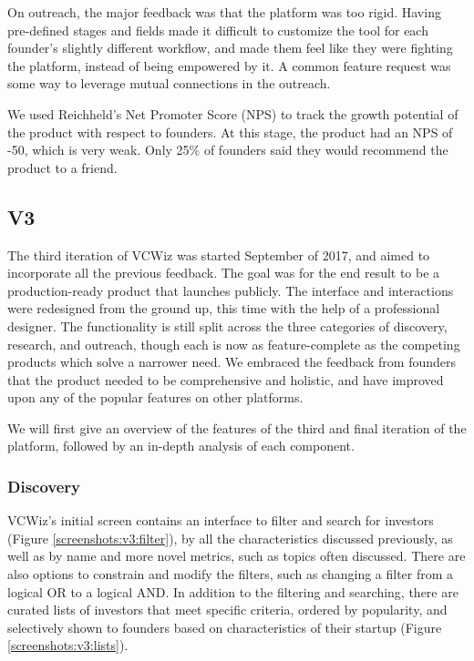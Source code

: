 On outreach, the major feedback was that the platform was too rigid. Having pre-defined stages and fields made it difficult to customize the tool for each founder's slightly different workflow, and made them feel like they were fighting the platform, instead of being empowered by it. A common feature request was some way to leverage mutual connections in the outreach.

We used Reichheld's Net Promoter Score (NPS) \cite{reichheld2003one} to track the growth potential of the product with respect to founders. At this stage, the product had an NPS of -50, which is very weak. Only 25\% of founders said they would recommend the product to a friend.

\subsection{V3}

The third iteration of VCWiz was started September of 2017, and aimed to incorporate all the previous feedback. The goal was for the end result to be a production-ready product that launches publicly. The interface and interactions were redesigned from the ground up, this time with the help of a professional designer. The functionality is still split across the three categories of discovery, research, and outreach, though each is now as feature-complete as the competing products which solve a narrower need. We embraced the feedback from founders that the product needed to be comprehensive and holistic, and have improved upon any of the popular features on other platforms.

We will first give an overview of the features of the third and final iteration of the platform, followed by an in-depth analysis of each component.

\subsubsection{Discovery}

VCWiz's initial screen contains an interface to filter and search for investors (Figure \ref{screenshots:v3:filter}), by all the characteristics discussed previously, as well as by name and more novel metrics, such as topics often discussed. There are also options to constrain and modify the filters, such as changing a filter from a logical OR to a logical AND. In addition to the filtering and searching, there are curated lists of investors that meet specific criteria, ordered by popularity, and selectively shown to founders based on characteristics of their startup (Figure \ref{screenshots:v3:lists}).

